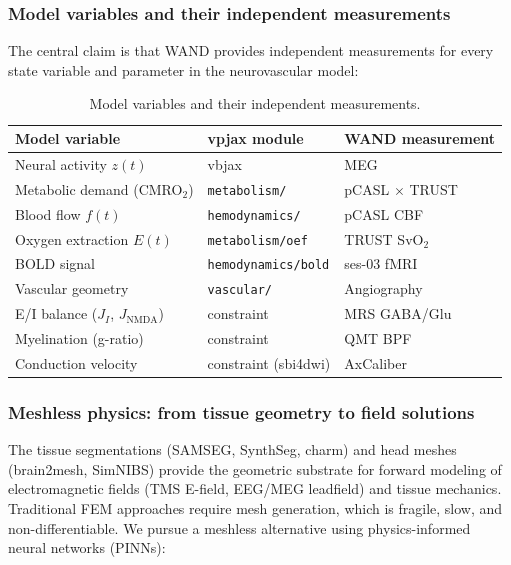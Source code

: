 \documentclass[11pt,a4paper]{article}\usepackage[]{graphicx}\usepackage[]{xcolor}
\begin{document}
\subsubsection{Model variables and their independent measurements}

The central claim is that WAND provides independent measurements for
every state variable and parameter in the neurovascular model:
%
\begin{table}[htbp]
\centering
\caption{Model variables and their independent measurements.}
\label{tab:variables}
\begin{tabular}{lll}
\toprule
Model variable & vpjax module & WAND measurement \\
\midrule
Neural activity $z(t)$      & vbjax               & MEG \\
Metabolic demand (CMRO$_2$) & \texttt{metabolism/} & pCASL $\times$ TRUST \\
Blood flow $f(t)$           & \texttt{hemodynamics/} & pCASL CBF \\
Oxygen extraction $E(t)$    & \texttt{metabolism/oef} & TRUST SvO$_2$ \\
BOLD signal                 & \texttt{hemodynamics/bold} & ses-03 fMRI \\
Vascular geometry           & \texttt{vascular/}   & Angiography \\
E/I balance ($J_I$, $J_\text{NMDA}$) & constraint & MRS GABA/Glu \\
Myelination (g-ratio)       & constraint           & QMT BPF \\
Conduction velocity         & constraint (sbi4dwi) & AxCaliber \\
\bottomrule
\end{tabular}
\end{table}

\subsubsection{Meshless physics: from tissue geometry to field solutions}

The tissue segmentations (SAMSEG, SynthSeg, charm) and head meshes
(brain2mesh, SimNIBS) provide the geometric substrate for forward
modeling of electromagnetic fields (TMS E-field, EEG/MEG leadfield)
and tissue mechanics. Traditional FEM approaches require mesh
generation, which is fragile, slow, and non-differentiable. We pursue
a meshless alternative using physics-informed neural networks (PINNs):
\end{document}
